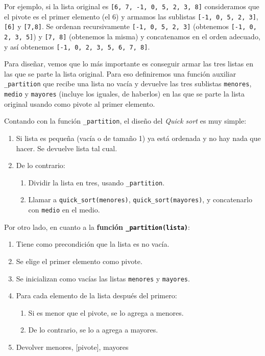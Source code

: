 Por ejemplo, si la lista original es \lstinline+[6, 7, -1, 0, 5, 2, 3, 8]+
consideramos que el pivote es el primer elemento (el 6) y armamos las
sublistas \lstinline+[-1, 0, 5, 2, 3]+, \lstinline+[6]+ y 
\lstinline+[7,8]+. Se ordenan recursivamente \lstinline+[-1, 0, 5, 2, 3]+
(obtenemos \lstinline+[-1, 0, 2, 3, 5]+) y \lstinline+[7, 8]+ (obtenemos la
misma) y concatenamos en el orden adecuado, y así obtenemos 
\lstinline+[-1, 0, 2, 3, 5, 6, 7, 8]+.

Para diseñar, vemos que lo más importante es conseguir armar las tres
listas en las que se parte la lista original. Para eso definiremos una
función auxiliar \lstinline!_partition! que recibe una lista no vacía y
devuelve las tres sublistas \lstinline!menores!, \lstinline!medio! y
\lstinline!mayores!  (incluye los iguales, de haberlos) en las que se parte
la lista original usando como pivote al primer elemento.

Contando con la función \lstinline!_partition!, el diseño del {\it Quick sort}
es muy simple:

\begin{enumerate}
\item Si lista es pequeña (vacía o de tamaño 1) ya está ordenada y
no hay nada que hacer. Se devuelve lista tal cual.
\item De lo contrario:
\begin{enumerate}
\item Dividir la lista en tres, usando \lstinline!_partition!.
\item Llamar a \lstinline!quick_sort(menores)!,
\lstinline!quick_sort(mayores)!, y concatenarlo con \lstinline!medio! en el
medio.
\end{enumerate}
\end{enumerate}

Por otro lado, en cuanto a la {\bf función \lstinline!_partition(lista)!}:

\begin{enumerate}
\item Tiene como precondición que la lista es no vacía.
\item Se elige el primer elemento como pivote.
\item Se inicializan como vacías las listas \lstinline!menores! y
\lstinline!mayores!.
\item Para cada elemento de la lista después del primero:
\begin{enumerate}
\item Si es menor que el pivote, se lo agrega a menores.
\item De lo contrario, se lo a agrega a mayores.
\end{enumerate}
\item Devolver menores, [pivote], mayores
\end{enumerate}

